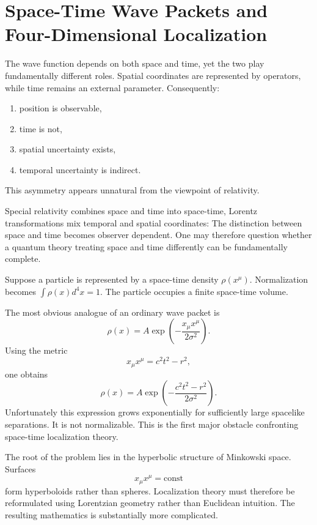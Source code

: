 \section{Space-Time Wave Packets and Four-Dimensional Localization}
The wave function depends on both space and time, yet the two play 
fundamentally different roles.
Spatial coordinates are represented by operators,
while time remains an external parameter.
Consequently:
\begin{enumerate}
\item position is observable,
\item time is not,
\item spatial uncertainty exists,
\item temporal uncertainty is indirect.
\end{enumerate}
This asymmetry appears unnatural from the viewpoint of relativity.

Special relativity combines space and time into space-time,
Lorentz transformations mix temporal and spatial coordinates:
The distinction between space and time becomes observer dependent.
One may therefore question whether a quantum theory treating space and 
time differently can be fundamentally complete.

Suppose a particle is represented by a space-time density $ \rho(x^\mu). $
Normalization becomes $ \int \rho(x)d^4x = 1. $
The particle occupies a finite space-time volume.

The most obvious analogue of an ordinary wave packet is
\begin{equation}
\rho(x)=A \exp \left(-\frac{x_\mu x^\mu}{2\sigma^2}\right).
\end{equation}
Using the metric
\begin{equation}
x_\mu x^\mu = c^2t^2-r^2,
\end{equation}
one obtains
\begin{equation}
\rho(x) = A \exp\left(-\frac{c^2t^2-r^2}{2\sigma^2}\right).
\end{equation}
Unfortunately this expression grows exponentially for sufficiently large 
spacelike separations.
It is not normalizable.
This is the first major obstacle confronting space-time localization theory.

The root of the problem lies in the hyperbolic structure of Minkowski space.
Surfaces
\begin{equation}
x_\mu x^\mu = \mathrm{const}
\end{equation}
form hyperboloids rather than spheres.
Localization theory must therefore be reformulated using Lorentzian geometry
rather than Euclidean intuition.
The resulting mathematics is substantially more complicated.

